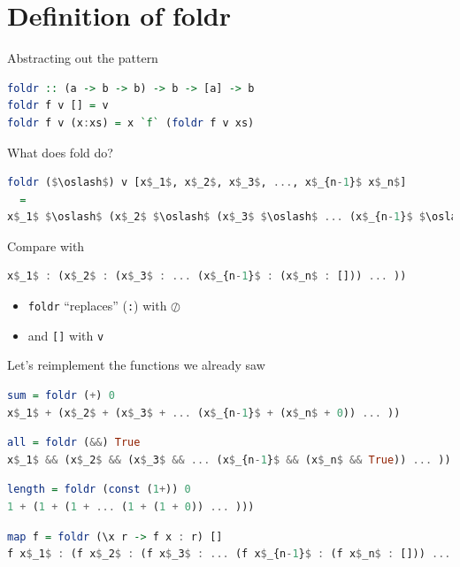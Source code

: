 \documentclass[lualatex]{beamer}
\renewcommand{\_}{\textscale{.6}{\textunderscore}}
\begin{document}
\section{Definition of foldr}

\begin{frame}[fragile]{Abstracting out the pattern}
\begin{lstlisting}[language=Haskell, morekeywords={foldr}]
foldr :: (a -> b -> b) -> b -> [a] -> b
foldr f v [] = v
foldr f v (x:xs) = x `f` (foldr f v xs)
\end{lstlisting}
\end{frame}

\begin{frame}[fragile]{What does fold do?}
\begin{lstlisting}[language=Haskell, morekeywords={foldr}]
foldr ($\oslash$) v [x$_1$, x$_2$, x$_3$, ..., x$_{n-1}$ x$_n$]
  =
x$_1$ $\oslash$ (x$_2$ $\oslash$ (x$_3$ $\oslash$ ... (x$_{n-1}$ $\oslash$ (x$_n$ $\oslash$ v)) ... ))
\end{lstlisting}
\vspace{5mm}
Compare with
\begin{lstlisting}[language=Haskell, morekeywords={foldr}]
x$_1$ : (x$_2$ : (x$_3$ : ... (x$_{n-1}$ : (x$_n$ : [])) ... ))
\end{lstlisting}
\pause
\begin{itemize}
\item{\texttt{foldr} ``replaces'' (\texttt{:}) with $\oslash$}
\item{and \texttt{[]} with \texttt{v}}
\end{itemize}
\end{frame}

\begin{frame}[fragile]{Let's reimplement the functions we already saw}
\begin{lstlisting}[language=Haskell, morekeywords={foldr}]
sum = foldr (+) 0
x$_1$ + (x$_2$ + (x$_3$ + ... (x$_{n-1}$ + (x$_n$ + 0)) ... ))
\end{lstlisting}
\pause
\begin{lstlisting}[language=Haskell, morekeywords={foldr}]
all = foldr (&&) True
x$_1$ && (x$_2$ && (x$_3$ && ... (x$_{n-1}$ && (x$_n$ && True)) ... ))
\end{lstlisting}
\pause
\begin{lstlisting}[language=Haskell, morekeywords={foldr}]
length = foldr (const (1+)) 0
1 + (1 + (1 + ... (1 + (1 + 0)) ... )))
\end{lstlisting}
\pause
\begin{lstlisting}[language=Haskell, morekeywords={foldr}]
map f = foldr (\x r -> f x : r) []
f x$_1$ : (f x$_2$ : (f x$_3$ : ... (f x$_{n-1}$ : (f x$_n$ : [])) ... ))
\end{lstlisting}
\end{frame}
\end{document}
